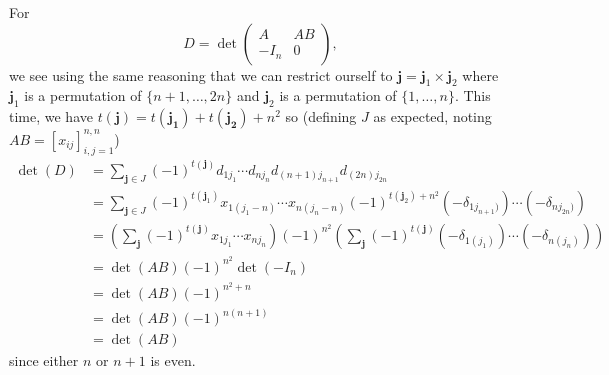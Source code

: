 \begin{solution}
  For
  \[
    D = \det\begin{pmatrix}
      A & AB\\
      -I_n & 0
    \end{pmatrix},
  \]
  we see using the same reasoning that we can restrict ourself to
  $\mathbf{j} = \mathbf{j}_1 \times \mathbf{j}_2$
  where $\mathbf{j}_1$ is a permutation of $\{n+1, \ldots, 2n\}$
  and $\mathbf{j}_2$ is a permutation of $\{1, \ldots, n\}$.
  This time, we have $t(\mathbf{j}) = t(\mathbf{j_1}) + t(\mathbf{j_2}) + n^2$ so
  (defining $J$ as expected, noting $AB = [x_{ij}]_{i,j=1}^{n,n}$)
  \begin{align*}
    \det(D)
    & = \sum_{\mathbf{j} \in J} (-1)^{t(\mathbf{j})} d_{1j_1} \cdots d_{nj_n} d_{(n+1)j_{n+1}} d_{(2n)j_{2n}}\\
    & = \sum_{\mathbf{j} \in J} (-1)^{t(\mathbf{j}_1)} x_{1(j_1-n)} \cdots x_{n(j_n-n)} (-1)^{t(\mathbf{j}_2)+n^2} (-\delta_{1j_{n+1})}) \cdots (-\delta_{nj_{2n})})\\
    & = \left(\sum_{\mathbf{j}} (-1)^{t(\mathbf{j})} x_{1j_1} \cdots x_{nj_n}\right)
    (-1)^{n^2}\left(\sum_{\mathbf{j}} (-1)^{t(\mathbf{j})} (-\delta_{1(j_1)}) \cdots (-\delta_{n(j_n)})\right)\\
    & = \det(AB) (-1)^{n^2}\det(-I_n)\\
    & = \det(AB) (-1)^{n^2+n}\\
    & = \det(AB) (-1)^{n(n+1)}\\
    & = \det(AB)
  \end{align*}
  since either $n$ or $n+1$ is even.
\end{solution}

